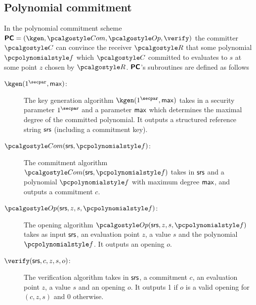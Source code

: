 \subsection{Polynomial commitment}
\label{sec:poly_com}
In the polynomial commitment scheme $\PCOM = (\kgen, \com, \open, \verify)$ the
committer $\committer$ can convince the receiver $\receiver$ that some
polynomial $\p{f}$ which $\committer$ committed to evaluates to $s$ at some
point $z$ chosen by $\receiver$. $\bm{\mathsf{PC}}$'s subroutines are defined as follows 
\begin{description}
\item[$\kgen(1^\secpar, \maxdeg)$:] The key generation algorithm
  $\kgen(1^\secpar, \maxdeg)$ takes in a security parameter $1^\secpar$ and a
  parameter $\mathsf{max}$ which determines the maximal degree of the committed
  polynomial. It outputs a structured reference string $\mathsf{srs}$ (including a
  commitment key).
\item[$\com(\srs, \p{f})$:] The commitment algorithm $\com(\srs, \p{f})$ takes
  in $\mathsf{srs}$ and a polynomial $\p{f}$ with maximum degree $\mathsf{max}$, and outputs
  a commitment $c$.
\item[$\open(\srs, z, s, \p{f})$:] The opening algorithm
  $\open(\srs, z, s, \p{f})$ takes as input $\mathsf{srs}$, an evaluation point $z$, a
  value $s$ and the polynomial $\p{f}$. It outputs an opening $o$.
\item[$\verify(\srs, c, z, s, o)$:] The verification algorithm takes in $\mathsf{srs}$,
  a commitment $c$, an evaluation point $z$, a value $s$ and an opening $o$. It
  outputs 1 if $o$ is a valid opening for $(c, z, s)$ and 0 otherwise.
\end{description}

